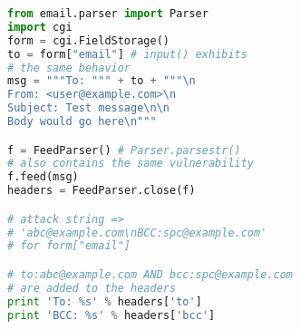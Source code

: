 \begin{lstlisting}[language=Python,caption={Python program with e-mail
      header injection vulnerability.},label={code:pyemi}, float]
from email.parser import Parser
import cgi
form = cgi.FieldStorage()
to = form["email"] # input() exhibits 
# the same behavior
msg = """To: """ + to + """\n
From: <user@example.com>\n
Subject: Test message\n\n
Body would go here\n"""

f = FeedParser() # Parser.parsestr() 
# also contains the same vulnerability
f.feed(msg)
headers = FeedParser.close(f)

# attack string => 
# 'abc@example.com\nBCC:spc@example.com'
# for form["email"]

# to:abc@example.com AND bcc:spc@example.com 
# are added to the headers
print 'To: %s' % headers['to']
print 'BCC: %s' % headers['bcc']
\end{lstlisting}
